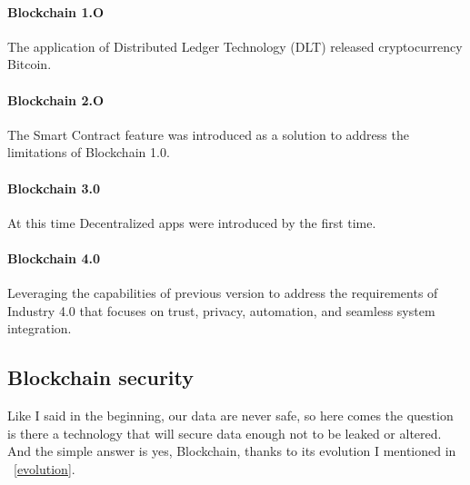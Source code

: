 \documentclass[10pt,english,a4paper]{article}
\begin{document}
\paragraph{Blockchain 1.O}
The application of Distributed Ledger Technology (DLT) released cryptocurrency Bitcoin.
\cite{Suroso:SKCK}
\paragraph{Blockchain 2.O}
The Smart Contract feature was introduced as a solution to address the limitations of Blockchain 1.0.
\cite{Suroso:SKCK}
\paragraph{Blockchain 3.0}
At this time Decentralized apps were introduced by the first time. 
\cite{Suroso:SKCK}
\paragraph{Blockchain 4.0}
Leveraging the capabilities of previous version to address the requirements of Industry 4.0 that focuses on trust, privacy, automation, and seamless system integration.
\cite{Suroso:SKCK}

\subsection{Blockchain security} %
Like I said in the beginning, our data are never safe, so here comes the question is there a technology that will secure data enough not to be leaked or altered. And the simple answer is yes, Blockchain, thanks to its evolution I mentioned in ~\ref{evolution}.
\end{document}
